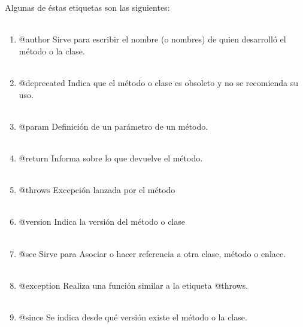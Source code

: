 \documentclass[20pt]{article}
\begin{document}
{Algunas de éstas etiquetas son las siguientes: }\\\\
\begin{enumerate}
\item{\large @author Sirve para escribir el nombre (o nombres) de quien desarrolló el método o la clase.}\\\\
\item{\large @deprecated Indica que el método o clase es obsoleto y no se recomienda su uso.}\\\\
\item{\large @param Definición de un parámetro de un método.}\\\\
\item{\large @return Informa sobre lo que devuelve el método.}\\\\
\item{\large @throws Excepción lanzada por el método}\\\\
\item{\large @version Indica la versión del método o clase}\\\\
\item{\large @see Sirve para Asociar o hacer referencia a otra clase, método o enlace.}\\\\
\item{\large @exception Realiza una función similar a la etiqueta @throws.}\\\\
\item{\large @since Se indica desde qué versión existe el método o la clase.}\\\\
  
\end{enumerate}
\end{document}
